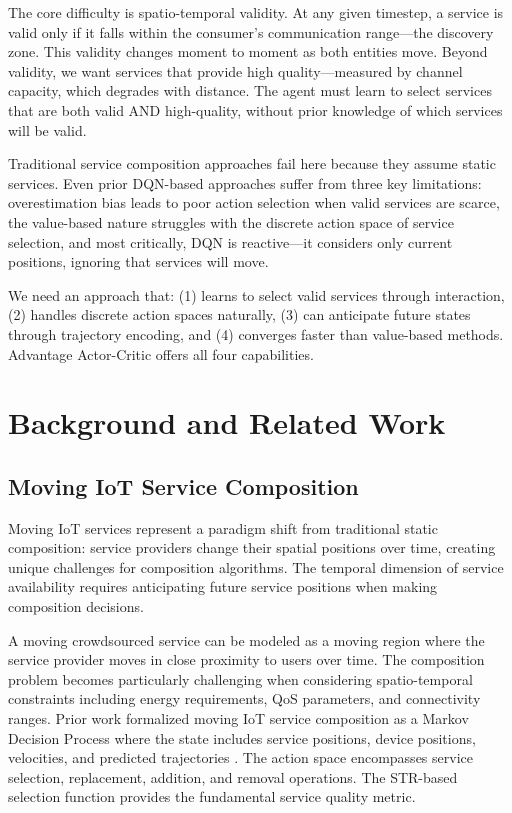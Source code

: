 \documentclass[10pt,twocolumn]{article}
\begin{document}
The core difficulty is spatio-temporal validity. At any given timestep,
a service is valid only if it falls within the consumer's communication
range---the discovery zone. This validity changes moment to moment as
both entities move. Beyond validity, we want services that provide high
quality---measured by channel capacity, which degrades with distance.
The agent must learn to select services that are both valid AND
high-quality, without prior knowledge of which services will be valid.

Traditional service composition approaches fail here because they assume
static services. Even prior DQN-based approaches suffer from three key
limitations: overestimation bias leads to poor action selection when
valid services are scarce, the value-based nature struggles with the
discrete action space of service selection, and most critically, DQN is
reactive---it considers only current positions, ignoring that services
will move.

We need an approach that: (1) learns to select valid services through
interaction, (2) handles discrete action spaces naturally, (3) can
anticipate future states through trajectory encoding, and (4) converges
faster than value-based methods. Advantage Actor-Critic offers all four
capabilities.

\section{Background and Related Work}\label{background-and-related-work}

\subsection{Moving IoT Service Composition}\label{moving-iot-service-composition}

Moving IoT services represent a paradigm shift from traditional static
composition: service providers change their spatial positions over time,
creating unique challenges for composition algorithms. The temporal
dimension of service availability requires anticipating future service
positions when making composition decisions.

A moving crowdsourced service can be modeled as a moving region where
the service provider moves in close proximity to users over time. The
composition problem becomes particularly challenging when considering
spatio-temporal constraints including energy requirements, QoS
parameters, and connectivity ranges. Prior work formalized moving IoT
service composition as a Markov Decision Process where the state
includes service positions, device positions, velocities, and predicted
trajectories \cite{neiat2021}. The action space encompasses service selection,
replacement, addition, and removal operations. The STR-based selection
function provides the fundamental service quality metric.
\end{document}
